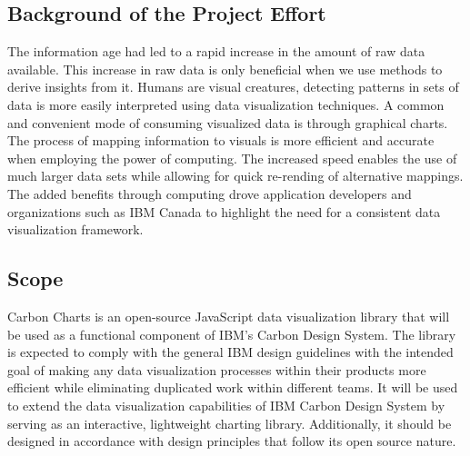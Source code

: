 \documentclass[12pt, titlepage]{article}
\begin{document}
\subsection{Background of the Project Effort}
The information age had led to a rapid increase in the amount of raw data available. This increase in raw data is only beneficial when we use methods to derive insights from it. Humans are visual creatures, detecting patterns in sets of data is more easily interpreted using data visualization techniques. A common and convenient mode of consuming visualized data is through graphical charts. The process of mapping information to visuals is more efficient and accurate when employing the power of computing. The increased speed enables the use of much larger data sets while allowing for quick re-rending of alternative mappings. The added benefits through computing drove application developers and organizations such as IBM Canada to highlight the need for a consistent data visualization framework.  


\subsection{Scope}
Carbon Charts is an open-source JavaScript data visualization library that will be used as a functional component of IBM's Carbon Design System. The library is expected to comply with the general IBM design guidelines with the intended goal of making any data visualization processes within their products more efficient while eliminating duplicated work within different teams. It will be used to extend the data visualization capabilities of IBM Carbon Design System by serving as an interactive, lightweight charting library. Additionally, it should be designed in accordance with design principles that follow its open source nature. 
\end{document}
